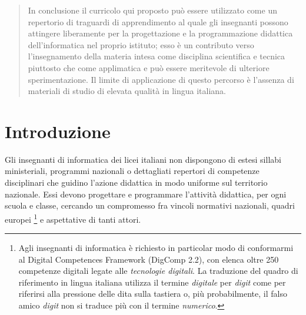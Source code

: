 \documentclass[a4paper]{easychair}
\begin{document}
\begin{abstract}
In conclusione il curricolo qui proposto può essere utilizzato come un
repertorio di traguardi di apprendimento al quale gli insegnanti possono attingere liberamente
per la progettazione e la programmazione didattica dell'informatica %
nel proprio istituto; esso è un contributo verso l'insegnamento della materia intesa come disciplina
scientifica e tecnica piuttosto che come applimatica
e può essere meritevole di ulteriore sperimentazione. Il limite di applicazione di questo percorso
è l'assenza di materiali di studio di elevata qualità in lingua italiana.
\end{abstract}


\setcounter{tocdepth}{2}

{\small
\tableofcontents}

\section{Introduzione}
\label{sect:introduction}

Gli insegnanti di informatica dei licei italiani
non dispongono di estesi sillabi ministeriali, programmi nazionali o
dettagliati repertori di competenze disciplinari che guidino l'azione didattica 
in modo uniforme sul territorio nazionale.
Essi devono progettare e programmare l'attività didattica, per ogni scuola e classe,
cercando un compromesso fra vincoli normativi nazionali,
quadri europei \footnote{Agli insegnanti di informatica è richiesto in particolar modo di conformarmi al Digital Competences Framework (DigComp 2.2),
con elenca oltre 250 competenze digitali legate alle \textit{tecnologie digitali}.
La traduzione del quadro di riferimento in lingua italiana utilizza il termine \textit{digitale}
per \textit{digit} come per riferirsi alla pressione delle dita sulla tastiera o,
più probabilmente, il falso amico \textit{digit} non si traduce più con il termine \textit{numerico}.}
e aspettative di tanti attori.
\end{document}
